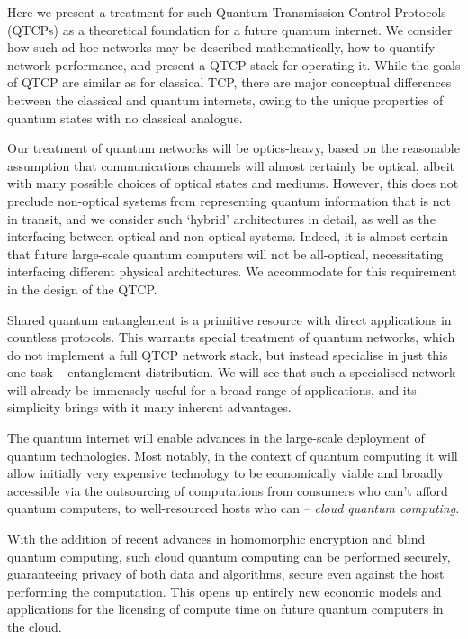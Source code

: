 \documentclass[aps, rmp, twocolumn, amsmath, amssymb, nofootinbib, superscriptaddress, longbibliography, floatfix, table-of-contents, eqsecnum]{revtex4-1}
\begin{document}
Here we present a treatment for such Quantum Transmission Control Protocols (QTCPs) as a theoretical foundation for a future quantum internet. We consider how such ad hoc networks may be described mathematically, how to quantify network performance, and present a QTCP stack for operating it. While the goals of QTCP are similar as for classical TCP, there are major conceptual differences between the classical and quantum internets, owing to the unique properties of quantum states with no classical analogue.

Our treatment of quantum networks will be optics-heavy, based on the reasonable assumption that communications channels will almost certainly be optical, albeit with many possible choices of optical states and mediums. However, this does not preclude non-optical systems from representing quantum information that is not in transit, and we consider such `hybrid' architectures in detail, as well as the interfacing between optical and non-optical systems. Indeed, it is almost certain that future large-scale quantum computers will not be all-optical, necessitating interfacing different physical architectures. We accommodate for this requirement in the design of the QTCP.

Shared quantum entanglement is a primitive resource with direct applications in countless protocols. This warrants special treatment of quantum networks, which do not implement a full QTCP network stack, but instead specialise in just this one task -- entanglement distribution. We will see that such a specialised network will already be immensely useful for a broad range of applications, and its simplicity brings with it many inherent advantages.

The quantum internet will enable advances in the large-scale deployment of quantum technologies. Most notably, in the context of quantum computing it will allow initially very expensive technology to be economically viable and broadly accessible via the outsourcing of computations from consumers who can't afford quantum computers, to well-resourced hosts who can -- \textit{cloud quantum computing}.

With the addition of recent advances in homomorphic encryption and blind quantum computing, such cloud quantum computing can be performed securely, guaranteeing privacy of both data and algorithms, secure even against the host performing the computation. This opens up entirely new economic models and applications for the licensing of compute time on future quantum computers in the cloud.
\end{document}
